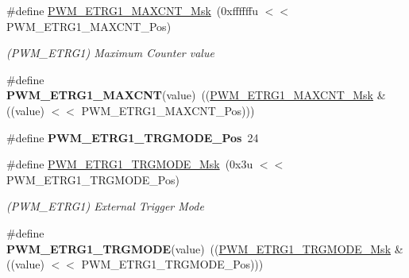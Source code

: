 \begin{DoxyCompactItemize}
\mbox{\label{group__SAMV71__PWM_ga40e436b483863606b48f361c07907623}} 
\#define \mbox{\hyperlink{group__SAMV71__PWM_ga40e436b483863606b48f361c07907623}{P\+W\+M\+\_\+\+E\+T\+R\+G1\+\_\+\+M\+A\+X\+C\+N\+T\+\_\+\+Msk}}~(0xffffffu $<$$<$ P\+W\+M\+\_\+\+E\+T\+R\+G1\+\_\+\+M\+A\+X\+C\+N\+T\+\_\+\+Pos)
\begin{DoxyCompactList}\small\item\em (P\+W\+M\+\_\+\+E\+T\+R\+G1) Maximum Counter value \end{DoxyCompactList}\item 
\mbox{\label{group__SAMV71__PWM_gaa9aa87930b869a1ddf671d0144142fb6}} 
\#define {\bfseries P\+W\+M\+\_\+\+E\+T\+R\+G1\+\_\+\+M\+A\+X\+C\+NT}(value)~((\mbox{\hyperlink{group__SAMV71__PWM_ga40e436b483863606b48f361c07907623}{P\+W\+M\+\_\+\+E\+T\+R\+G1\+\_\+\+M\+A\+X\+C\+N\+T\+\_\+\+Msk}} \& ((value) $<$$<$ P\+W\+M\+\_\+\+E\+T\+R\+G1\+\_\+\+M\+A\+X\+C\+N\+T\+\_\+\+Pos)))
\item 
\mbox{\label{group__SAMV71__PWM_gab807eb0d6e77c0e2ac87d90c3df8df2f}} 
\#define {\bfseries P\+W\+M\+\_\+\+E\+T\+R\+G1\+\_\+\+T\+R\+G\+M\+O\+D\+E\+\_\+\+Pos}~24
\item 
\mbox{\label{group__SAMV71__PWM_gaec425b88b6c97857d3997c8344b36320}} 
\#define \mbox{\hyperlink{group__SAMV71__PWM_gaec425b88b6c97857d3997c8344b36320}{P\+W\+M\+\_\+\+E\+T\+R\+G1\+\_\+\+T\+R\+G\+M\+O\+D\+E\+\_\+\+Msk}}~(0x3u $<$$<$ P\+W\+M\+\_\+\+E\+T\+R\+G1\+\_\+\+T\+R\+G\+M\+O\+D\+E\+\_\+\+Pos)
\begin{DoxyCompactList}\small\item\em (P\+W\+M\+\_\+\+E\+T\+R\+G1) External Trigger Mode \end{DoxyCompactList}\item 
\mbox{\label{group__SAMV71__PWM_ga2abd3c28a286b3dad7348286a5aef75b}} 
\#define {\bfseries P\+W\+M\+\_\+\+E\+T\+R\+G1\+\_\+\+T\+R\+G\+M\+O\+DE}(value)~((\mbox{\hyperlink{group__SAMV71__PWM_gaec425b88b6c97857d3997c8344b36320}{P\+W\+M\+\_\+\+E\+T\+R\+G1\+\_\+\+T\+R\+G\+M\+O\+D\+E\+\_\+\+Msk}} \& ((value) $<$$<$ P\+W\+M\+\_\+\+E\+T\+R\+G1\+\_\+\+T\+R\+G\+M\+O\+D\+E\+\_\+\+Pos)))
\item 
\mbox{\label{group__SAMV71__PWM_gab78ee7b73c5e1f7bbdf482379c2327a4}} 

\end{DoxyCompactItemize}

